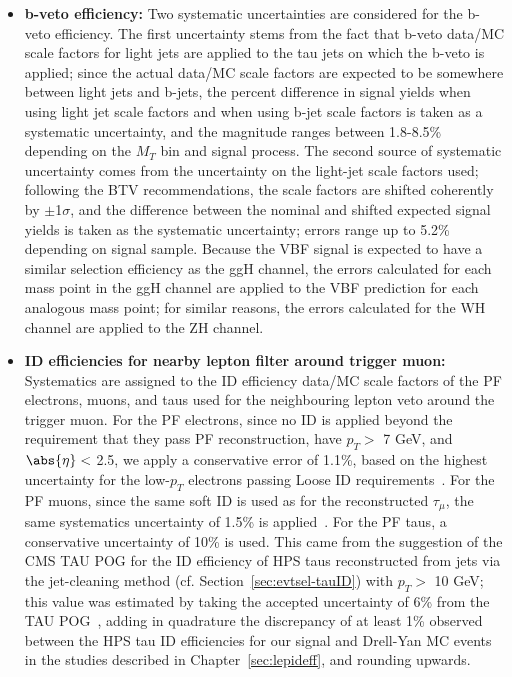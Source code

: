 \begin{itemize}
\item \textbf{b-veto efficiency: } Two systematic uncertainties are considered for the b-veto efficiency. The first uncertainty stems from the fact that b-veto data/MC scale factors for light jets are applied to the tau jets on which the b-veto is applied; since the actual data/MC scale factors are expected to be somewhere between light jets and b-jets, the percent difference in signal yields when using light jet scale factors and when using b-jet scale factors is taken as a systematic uncertainty, and the magnitude ranges between 1.8-8.5\% depending on the $M_{T}$ bin and signal process. The second source of systematic uncertainty comes from the uncertainty on the light-jet scale factors used; following the BTV recommendations, the scale factors are shifted coherently by $\pm$1$\sigma$, and the difference between the nominal and shifted expected signal yields is taken as the systematic uncertainty; errors range up to 5.2\% depending on signal sample. Because the VBF signal is expected to have a similar selection efficiency as the ggH channel, the errors calculated for each mass point in the ggH channel are applied to the VBF prediction for each analogous mass point; for similar reasons, the errors calculated for the WH channel are applied to the ZH channel.
\item \textbf{ID efficiencies for nearby lepton filter around trigger muon: } Systematics are assigned to the ID efficiency data/MC scale factors of the PF electrons, muons, and taus used for the neighbouring lepton veto around the trigger muon. For the PF electrons, since no ID is applied beyond the requirement that they pass PF reconstruction, have $p_T >$ 7 GeV, and $\abs{\eta} <$ 2.5, we apply a conservative error of 1.1\%, based on the highest uncertainty for the low-$p_T$ electrons passing Loose ID requirements~\cite{CMS:egammauncertaintytwiki}. For the PF muons, since the same soft ID is used as for the reconstructed $\tau_{\mu}$, the same systematics uncertainty of 1.5\% is applied~\cite{CMS:muonuncertaintytwiki}. For the PF taus, a conservative uncertainty of 10\% is used. This came from the suggestion of the CMS TAU POG for the ID efficiency of HPS taus reconstructed from jets via the jet-cleaning method (cf. Section~\ref{sec:evtsel-tauID}) with $p_T >$ 10 GeV; this value was estimated by taking the accepted uncertainty of 6\% from the TAU POG~\cite{CMS:tauuncertaintytwiki}, adding in quadrature the discrepancy of at least 1\% observed between the HPS tau ID efficiencies for our signal and Drell-Yan MC events in the studies described in Chapter~\ref{sec:lepideff}, and rounding upwards.

\end{itemize}
